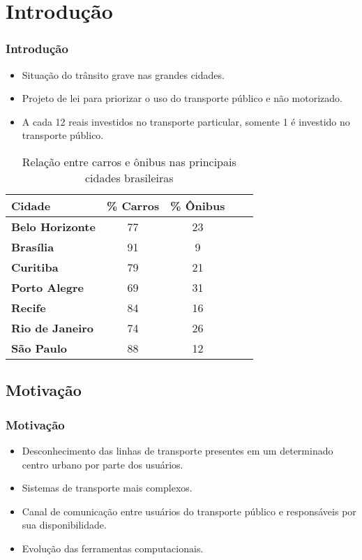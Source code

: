 \section{Introdução}

\frame
{
\frametitle{Introdução}
\begin{itemize}
\item Situação do trânsito grave nas grandes cidades.
\item Projeto de lei para priorizar o uso do transporte público e não motorizado.
\item A cada 12 reais investidos no transporte particular, somente 1 é investido no transporte público.
\end{itemize}

\begin{table}[!htb]
	\scriptsize
	\centering
	\caption{Relação entre carros e ônibus nas principais cidades brasileiras}
	\label{tab:carro_onibus}
	\begin{tabular}{lcccc}
		\hline
		\textbf{Cidade} & \textbf{\% Carros} & \textbf{\% Ônibus} \\
		\hline
		\textbf{Belo Horizonte} & 77 & 23 \\
		\textbf{Brasília} & 91 & 9 \\
		\textbf{Curitiba} & 79 & 21 \\
		\textbf{Porto Alegre} & 69 & 31 \\
		\textbf{Recife} & 84 & 16 \\
		\textbf{Rio de Janeiro} & 74 & 26 \\
		\textbf{São Paulo} & 88 & 12 \\
		\hline
	\end{tabular}
\end{table}
}

\subsection{Motivação}
\frame
{
\frametitle{Motivação}
\begin{itemize}
\item Desconhecimento das linhas de transporte presentes em um determinado centro urbano por parte dos usuários.
\item Sistemas de transporte mais complexos.
\item Canal de comunicação entre usuários do transporte público e responsáveis por sua disponibilidade.
\item Evolução das ferramentas computacionais.
\end{itemize}
}

